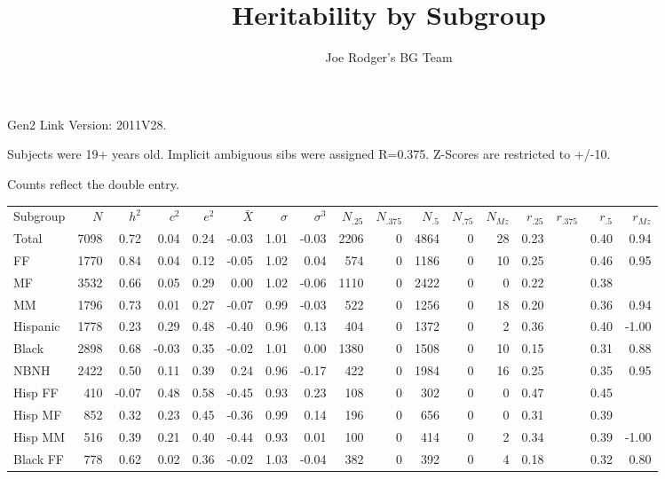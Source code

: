 \documentclass[a4paper]{article}
\title{Heritability by Subgroup}
\author{Joe Rodger's BG Team}
\begin{document}
\maketitle
Gen2 Link Version: 2011V28.


Subjects were 19+ years old.  Implicit ambiguous sibs were assigned R=0.375. Z-Scores are restricted to  +/-10.

Counts reflect the double entry.
\begin{table}[ht]
\begin{center}
\begin{tabular}{lr|rrr|rrr|rrrrr|rrrr}
 Subgroup & $N$ & $h^2$ & $c^2$ & $e^2$ & $\bar{X}$ & $\sigma$ & $\sigma^3$ & $N_{.25}$ & $N_{.375}$ & $N_{.5}$ & $N_{.75}$ & $N_{Mz}$ & $r_{.25}$ & $r_{.375}$ & $r_{.5}$ & $r_{Mz}$ \\ 
 Total & 7098 & 0.72 & 0.04 & 0.24 & -0.03 & 1.01 & -0.03 & 2206 & 0 & 4864 & 0 & 28 & 0.23 &  & 0.40 & 0.94 \\ 
   \hline
FF & 1770 & 0.84 & 0.04 & 0.12 & -0.05 & 1.02 & 0.04 & 574 & 0 & 1186 & 0 & 10 & 0.25 &  & 0.46 & 0.95 \\ 
  MF & 3532 & 0.66 & 0.05 & 0.29 & 0.00 & 1.02 & -0.06 & 1110 & 0 & 2422 & 0 & 0 & 0.22 &  & 0.38 &  \\ 
  MM & 1796 & 0.73 & 0.01 & 0.27 & -0.07 & 0.99 & -0.03 & 522 & 0 & 1256 & 0 & 18 & 0.20 &  & 0.36 & 0.94 \\ 
   \hline
Hispanic & 1778 & 0.23 & 0.29 & 0.48 & -0.40 & 0.96 & 0.13 & 404 & 0 & 1372 & 0 & 2 & 0.36 &  & 0.40 & -1.00 \\ 
  Black & 2898 & 0.68 & -0.03 & 0.35 & -0.02 & 1.01 & 0.00 & 1380 & 0 & 1508 & 0 & 10 & 0.15 &  & 0.31 & 0.88 \\ 
  NBNH & 2422 & 0.50 & 0.11 & 0.39 & 0.24 & 0.96 & -0.17 & 422 & 0 & 1984 & 0 & 16 & 0.25 &  & 0.35 & 0.95 \\ 
   \hline
Hisp FF & 410 & -0.07 & 0.48 & 0.58 & -0.45 & 0.93 & 0.23 & 108 & 0 & 302 & 0 & 0 & 0.47 &  & 0.45 &  \\ 
  Hisp MF & 852 & 0.32 & 0.23 & 0.45 & -0.36 & 0.99 & 0.14 & 196 & 0 & 656 & 0 & 0 & 0.31 &  & 0.39 &  \\ 
  Hisp MM & 516 & 0.39 & 0.21 & 0.40 & -0.44 & 0.93 & 0.01 & 100 & 0 & 414 & 0 & 2 & 0.34 &  & 0.39 & -1.00 \\ 
   \hline
Black FF & 778 & 0.62 & 0.02 & 0.36 & -0.02 & 1.03 & -0.04 & 382 & 0 & 392 & 0 & 4 & 0.18 &  & 0.32 & 0.80 \\ 

\end{tabular}
\end{center}
\end{table}
\end{document}
